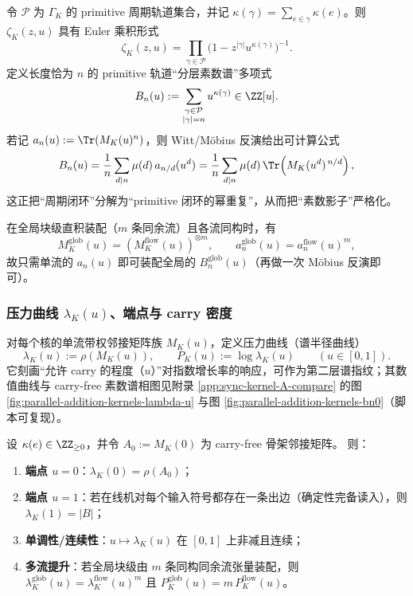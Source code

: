 令 $\mathcal{P}$ 为 $\Gamma_K$ 的 primitive 周期轨道集合，并记 $\kappa(\gamma)=\sum_{e\in\gamma}\kappa(e)$。则 $\zeta_K(z,u)$ 具有 Euler 乘积形式
\[
\zeta_K(z,u)=\prod_{\gamma\in\mathcal{P}}\bigl(1-z^{|\gamma|}u^{\kappa(\gamma)}\bigr)^{-1}.
\]
定义长度恰为 $n$ 的 primitive 轨道“分层素数谱”多项式
\[
B_n(u):=\sum_{\substack{\gamma\in\mathcal{P}\\|\gamma|=n}}u^{\kappa(\gamma)}\in\ZZ[u].
\]
若记 $a_n(u):=\Tr(M_K(u)^n)$，则 Witt/Möbius 反演给出可计算公式
\[
B_n(u)=\frac{1}{n}\sum_{d\mid n}\mu(d)\,a_{n/d}(u^d)
=\frac{1}{n}\sum_{d\mid n}\mu(d)\,\Tr\!\left(M_K(u^d)^{\,n/d}\right),
\]
这正把“周期闭环”分解为“primitive 闭环的幂重复”，从而把“素数影子”严格化。

在全局块级直积装配（$m$ 条同余流）且各流同构时，有
\[
M_K^{\mathrm{glob}}(u)=(M_K^{\mathrm{flow}}(u))^{\otimes m},\qquad
a_n^{\mathrm{glob}}(u)=a_n^{\mathrm{flow}}(u)^m,
\]
故只需单流的 $a_n(u)$ 即可装配全局的 $B_n^{\mathrm{glob}}(u)$（再做一次 Möbius 反演即可）。

\subsubsection{压力曲线 \texorpdfstring{$\lambda_K(u)$}{lambda(u)}、端点与 carry 密度}\label{subsec:kernel-pressure-curve}
对每个核的单流带权邻接矩阵族 $M_K(u)$，定义压力曲线（谱半径曲线）
\[
\lambda_K(u):=\rho(M_K(u)),\qquad P_K(u):=\log\lambda_K(u)\qquad(u\in[0,1]).
\]
它刻画“允许 carry 的程度（$u$）”对指数增长率的响应，可作为第二层谱指纹；其数值曲线与 carry-free 素数谱相图见附录 \ref{app:sync-kernel-A-compare} 的图 \ref{fig:parallel-addition-kernels-lambda-u} 与图 \ref{fig:parallel-addition-kernels-bn0}（脚本可复现）。

\begin{proposition}[端点、单调性与多流提升]\label{prop:kernel-pressure-endpoints}
设 $\kappa(e)\in\ZZ_{\ge 0}$，并令 $A_0:=M_K(0)$ 为 carry-free 骨架邻接矩阵。
则：
\begin{enumerate}
  \item \textbf{端点 $u=0$}：$\lambda_K(0)=\rho(A_0)$；
  \item \textbf{端点 $u=1$}：若在线机对每个输入符号都存在一条出边（确定性完备读入），则 $\lambda_K(1)=|B|$；
  \item \textbf{单调性/连续性}：$u\mapsto \lambda_K(u)$ 在 $[0,1]$ 上非减且连续；
  \item \textbf{多流提升}：若全局块级由 $m$ 条同构同余流张量装配，则
  \(
  \lambda^{\mathrm{glob}}_K(u)=\lambda^{\mathrm{flow}}_K(u)^m
  \)
  且
  \(
  P^{\mathrm{glob}}_K(u)=m\,P^{\mathrm{flow}}_K(u)
  \)。
\end{enumerate}
\end{proposition}

